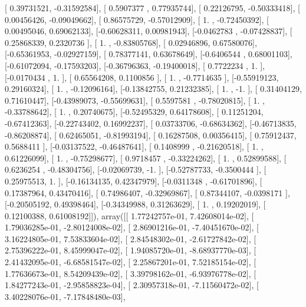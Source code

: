 \documentclass{article}
\begin{document}
       [ 0.39731521, -0.31592584],
       [ 0.5907377 ,  0.77935744],
       [ 0.22126795, -0.50333418],
       [ 0.00456426, -0.09049662],
       [ 0.86575729, -0.57012909],
       [ 1.        , -0.72450392],
       [ 0.00495046,  0.69062133],
       [-0.60628311,  0.00981943],
       [-0.0462783 , -0.07428837],
       [ 0.25868339,  0.2320736 ],
       [ 1.        , -0.83805768],
       [ 0.02946896,  0.67580076],
       [-0.65361953, -0.02927159],
       [ 0.78377141,  0.63678649],
       [-0.6406544 ,  0.68001103],
       [-0.61072094, -0.17593203],
       [-0.36796363, -0.19400018],
       [ 0.7722234 ,  1.        ],
       [-0.0170434 ,  1.        ],
       [ 0.65564208,  0.1100856 ],
       [ 1.        , -0.7714635 ],
       [-0.55919123,  0.29160324],
       [ 1.        , -0.12096164],
       [-0.13842755,  0.21232385],
       [ 1.        , -1.        ],
       [ 0.31404129,  0.71610447],
       [-0.43989073, -0.55699631],
       [ 0.5597581 , -0.78020815],
       [ 1.        , -0.33788642],
       [ 1.        ,  0.20740675],
       [-0.52495329,  0.64178608],
       [ 0.11251204, -0.67412363],
       [-0.22743402,  0.16992237],
       [ 0.03733706, -0.68634362],
       [-0.46713835, -0.86208874],
       [ 0.62465051, -0.81993194],
       [ 0.16287508,  0.00356415],
       [ 0.75912437,  0.5688411 ],
       [-0.03137522, -0.46487641],
       [ 0.1408999 , -0.21620518],
       [ 1.        ,  0.61226099],
       [ 1.        , -0.75298677],
       [ 0.9718457 , -0.33224262],
       [ 1.        ,  0.52899588],
       [ 0.6236254 , -0.48304756],
       [-0.02069739, -1.        ],
       [-0.52787733, -0.3500444 ],
       [ 0.25975513,  1.        ],
       [-0.16134135,  0.42347979],
       [-0.0311348 , -0.61701896],
       [ 0.17387964,  0.43470416],
       [ 0.74986407, -0.32969867],
       [ 0.87344107, -0.0398171 ],
       [-0.20505192,  0.49398464],
       [-0.34349988,  0.31263629],
       [ 1.        ,  0.19202019],
       [ 0.12100388,  0.61008192]]), array([[  1.77242757e-01,   7.42608014e-02],
       [  1.79036285e-01,  -2.80124008e-02],
       [  2.86901216e-01,  -7.40451670e-02],
       [  3.16224805e-01,   7.53833604e-02],
       [  2.84548302e-01,  -2.61727842e-02],
       [  2.75396222e-01,   8.45999047e-02],
       [  1.94085720e-01,  -8.68937770e-03],
       [  2.41432095e-01,  -6.68581547e-02],
       [  2.25867201e-01,   7.52185154e-02],
       [  1.77636673e-01,   8.54209439e-02],
       [  3.39798162e-01,  -6.93976778e-02],
       [  1.84277243e-01,  -2.95858823e-04],
       [  2.30957318e-01,  -7.11560472e-02],
       [  3.40228076e-01,  -7.17848480e-03],
\end{document}

